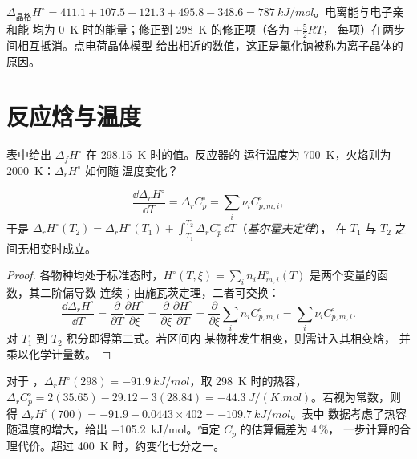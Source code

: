 \begin{example}[氯化钠]\label{ex:b2:reaction-enthalpy:nacl}
$\Delta_{\text{晶格}}H^\circ = 411.1 + 107.5 + 121.3 + 495.8 - 348.6 =
\qty{787}{kJ/mol}$。电离能与电子亲和能
均为 \qty{0}{K} 时的能量；修正到 \qty{298}{K} 的修正项（各为 $+\tfrac52RT$，
每项）在两步间相互抵消。点电荷晶体模型
给出相近的数值，这正是氯化钠被称为离子晶体的原因。
\end{example}

\section{反应焓与温度}

表中给出 $\Delta_f H^\circ$ 在 \qty{298.15}{K} 时的值。反应器的
运行温度为 \qty{700}{K}，火焰则为 \qty{2000}{K}：$\Delta_r H^\circ$ 如何随
温度变化？

\begin{theorem}[基尔霍夫定律]\label{thm:b2:reaction-enthalpy:kirchhoff}
\[
  \frac{\dd\Delta_r H^\circ}{\dd T} = \Delta_r C_p^\circ =
  \sum_i\nu_i C_{p,m,i}^\circ ,
\]
于是 $\Delta_r H^\circ(T_2) = \Delta_r H^\circ(T_1) + \int_{T_1}^{T_2}
\Delta_r C_p^\circ\,\dd T$（\emph{基尔霍夫定律}），
在 $T_1$ 与 $T_2$ 之间无相变时成立。
\end{theorem}

\begin{proof}
各物种均处于标准态时，$H^\circ(T, \xi) = \sum_in_i
H^\circ_{m,i}(T)$ 是两个变量的函数，其二阶偏导数
连续；由施瓦茨定理，二者可交换：
\[
  \frac{\dd\Delta_r H^\circ}{\dd T} = \frac{\partial}{\partial T}
  \frac{\partial H^\circ}{\partial\xi} = \frac{\partial}{\partial\xi}
  \frac{\partial H^\circ}{\partial T} = \frac{\partial}{\partial\xi}
  \sum_in_iC^\circ_{p,m,i} = \sum_i\nu_iC^\circ_{p,m,i}.
\]
对 $T_1$ 到 $T_2$ 积分即得第二式。若区间内
某物种发生相变，则需计入其相变焓，
并乘以化学计量数。
\end{proof}

\begin{example}[高温下的合成氨]\label{ex:b2:reaction-enthalpy:kirchhoff}
对于 ，$\Delta_r H^\circ(298) =
\qty{-91.9}{kJ/mol}$，取 \qty{298}{K} 时的热容，
$\Delta_r C_p^\circ = 2(35.65) - 29.12 - 3(28.84) =
\qty{-44.3}{J/(K.mol)}$。若视为常数，则得 $\Delta_r
H^\circ(700) = -91.9 - 0.0443 \times 402 = \qty{-109.7}{kJ/mol}$。表中
数据考虑了热容随温度的增大，给出
\qty{-105.2}{kJ/mol}。恒定 $C_p$ 的估算偏差为 4\,\%，
一步计算的合理代价。超过 \qty{400}{K} 时，约变化七分之一。
\end{example}

